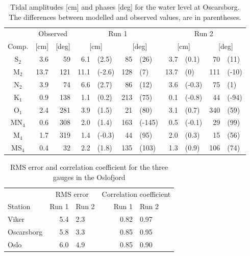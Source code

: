 \begin{table}[ht]
\caption{Tidal amplitudes [cm] and phases [deg] for the water level at Oscarsborg. The differences between modelled and observed values, are in parentheses.}
\label{tab:Oscarsborg}
\centering
\begin{tabular}{crrr@{ }lr@{ }lr@{ }lr@{ }l} \hline
      & \multicolumn{2}{c}{Observed} & \multicolumn{4}{c}{Run 1} & \multicolumn{4}{c}{Run 2}  \\
Comp. &  [cm] & [deg] & \multicolumn{2}{c}{[cm]} & \multicolumn{2}{c}{[deg]} & \multicolumn{2}{c}{[cm]} & \multicolumn{2}{c}{[deg]} \\ \hline 
S$_2$  &   3.6 &  59  &   6.1 & (2.5)  &  85 & (26)   &  3.7 & (0.1)  &  70 & (11)  \\
M$_2$  &  13.7 & 121  &  11.1 & (-2.6) & 128 & (7)    & 13.7 & (0)    & 111 & (-10) \\
N$_2$  &   3.9 &  74  &   6.6 & (2.7)  &  86 & (12)   &  3.6 & (-0.3) &  75 & (1)   \\
K$_1$  &   0.9 & 138  &   1.1 & (0.2)  & 213 & (75)   &  0.1 & (-0.8) &  44 & (-94) \\
O$_1$  &   2.4 & 281  &   3.9 & (1.5)  &  21 & (80)   &  3.1 & (0.7)  & 340 & (59)  \\
MN$_4$ &   0.6 & 308  &   2.0 & (1.4)  & 163 & (-145) &  0.5 & (-0.1) &  29 & (99)  \\
M$_4$  &   1.7 & 319  &   1.4 & (-0.3) &  44 & (95)   &  2.0 & (0.3)  &  15 & (56)  \\
MS$_4$ &   0.4 &  32  &   2.2 & (1.8)  & 135 & (103)  &  1.3 & (0.9)  & 106 & (74)  \\ \hline 
\end{tabular}
\end{table}

\begin{table}[ht]
\caption{RMS error and correlation coefficient for the three gauges in the Oslofjord}
\label{tab:RMS}
\centering
\begin{tabular}{lrlrl} \hline
 & \multicolumn{2}{c}{RMS error} & \multicolumn{2}{c}{Correlation coefficient} \\ 
Station & Run 1 & Run 2 & \hspace{0.5cm} Run 1 & Run 2 \\ \hline 
Viker      & 5.4 &   2.3 &  0.82  &  0.97 \\
Oscarsborg & 5.8 &   3.3 &  0.85  &  0.95 \\
Oslo       & 6.0 &   4.9 &  0.85  &  0.90 \\ \hline
\end{tabular}
\end{table}


